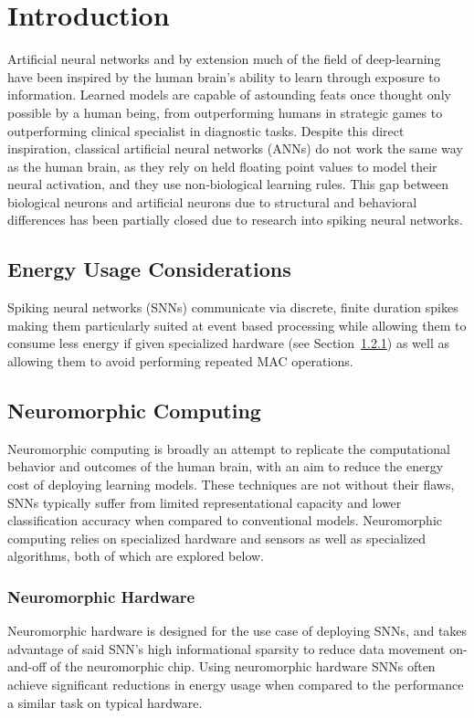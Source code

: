 \documentclass[../main.tex]{subfiles}
\begin{document}
\section{Introduction}
\label{sec:intro}
Artificial neural networks and by extension much of the field of deep-learning have been inspired by the human brain's ability to learn through exposure to information\cite{training}. Learned models are capable of astounding feats once thought only possible by a human being, from outperforming humans in strategic games to outperforming clinical specialist in diagnostic tasks\cite{training}. Despite this direct inspiration, classical artificial neural networks (ANNs) do not work the same way as the human brain, as they rely on held floating point values to model their neural activation, and they use non-biological learning rules\cite{single}. This gap between biological neurons and artificial neurons due to structural and behavioral differences has been partially closed due to research into spiking neural networks\cite{single}.

\subsection{Energy Usage Considerations}
Spiking neural networks (SNNs) communicate via discrete, finite duration spikes\cite{STAtten}\cite{xnor} making them particularly suited at event based processing while allowing them to consume less energy if given specialized hardware (see Section~\ref{sec:neurHard}) \cite{optimizing} as well as allowing them to avoid performing repeated MAC operations\cite{xnor}.

\subsection{Neuromorphic Computing}
Neuromorphic computing is broadly an attempt to replicate the computational behavior and outcomes of the human brain, with an aim to reduce the energy cost of deploying learning models\cite{training}\cite{imageClass}. These techniques are not without their flaws, SNNs typically suffer from limited representational capacity and lower classification accuracy when compared to conventional models\cite{imageClass}. Neuromorphic computing relies on specialized hardware and sensors as well as specialized algorithms, both of which are explored below.

\subsubsection{Neuromorphic Hardware}
\label{sec:neurHard}
Neuromorphic hardware is designed for the use case of deploying SNNs, and takes advantage of said SNN's high informational sparsity to reduce data movement on-and-off of the neuromorphic chip\cite{training}. Using neuromorphic hardware SNNs often achieve significant reductions in energy usage when compared to the performance a similar task on typical hardware\cite{training}.
\end{document}
